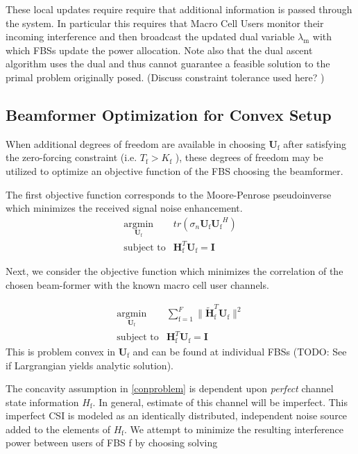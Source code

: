 \documentclass[12pt,a4paper]{report}
\begin{document}
These local updates require require that additional information is passed through the system. In particular this requires that Macro Cell Users monitor their incoming interference and then broadcast the updated dual variable $\lambda_{\text{m}}$ with which FBSs update the power allocation. 
Note also that the dual ascent algorithm uses the dual and thus cannot guarantee a feasible solution to the primal problem originally posed. (Discuss constraint tolerance used here? )

\subsection{Beamformer Optimization for Convex Setup}
When additional degrees of freedom are available in choosing $\mathbf{U}_{\mathrm{f}}$ after satisfying the zero-forcing constraint (i.e. $T_{\text{f}}> K_{\text{f}}$ ), these degrees of freedom may be utilized to optimize an objective function of the FBS choosing the beamformer. 
\par
The first objective function corresponds to the Moore-Penrose pseudoinverse which minimizes the received signal noise enhancement. 
    \begin{equation}
    \begin{array}{ll}
    \underset{\mathbf{U}_{\mathrm{f}} }{\text{argmin}}   & tr(\sigma_n\mathbf{U_{\mathrm{f}}}  \mathbf{U_{\mathrm{f}}}^H)
    \\
    \mbox{subject to} & \mathbf{H}_{\mathrm{f}}^T  \mathbf{U_{\mathrm{f}}} = \mathbf{I}
    \end{array}
    \label{e-opt-prob}
    \end{equation}

    \par
Next, we consider the objective function which minimizes the correlation of the chosen beam-former with the known macro cell user channels.

    \begin{equation}
    \begin{array}{ll}
    \underset{\mathbf{U}_{\mathrm{f}} }{\text{argmin}}   & \sum^F_{\text{f}=1} \|\mathbf{\tilde{H}}_{\mathrm{f}}^T  \mathbf{U_{\mathrm{f}}}\|^2
    \\
    \mbox{subject to} & \mathbf{H}_{\mathrm{f}}^T  \mathbf{U_{\mathrm{f}}} = \mathbf{I}
    \end{array}
    \label{e-opt-prob}
    \end{equation}
This is problem convex in $\mathbf{U}_{\mathrm{f}}$ and can be found at individual FBSs (TODO: See if Largrangian yields analytic solution).
\par
The concavity assumption in \ref{conproblem} is dependent upon \emph{perfect} channel state information $H_{\text{f}}$. In general, estimate of this channel will be imperfect. This imperfect CSI is modeled as an identically distributed, independent noise source added to the elements of $H_{\text{f}}$. We attempt to minimize the resulting interference power between users of FBS f by choosing solving 
\end{document}
